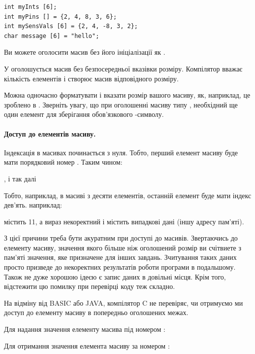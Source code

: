 \documentclass[12pt,a4paper]{report}  %
\begin{document}
\begin{lstlisting}[label=conditionoperator,caption=Оголошення масиву]
int myInts [6];
int myPins [] = {2, 4, 8, 3, 6};
int mySensVals [6] = {2, 4, -8, 3, 2};
char message [6] = "hello";
\end{lstlisting}

Ви можете оголосити масив без його ініціалізації як .

У  оголошується масив без безпосередньої вказівки розміру. Компілятор вважає кількість елементів і створює масив відповідного розміру.

Можна одночасно форматувати і вказати розмір вашого масиву, як, наприклад, це зроблено в . Зверніть увагу, що при оголошенні масиву типу , необхідний ще один елемент для зберігання обов'язкового -символу.

\paragraph{Доступ до елементів масиву.}
Індексація в масивах починається з нуля. Тобто, перший елемент масиву буде мати порядковий номер . Таким чином:

, і так далі

Тобто, наприклад, в масиві з десяти елементів, останній елемент буде мати індекс дев'ять. наприклад:

 містить 11, а вираз  некоректний і містить випадкові дані (іншу адресу пам'яті).

З цієї причини треба бути акуратним при доступі до масивів. Звертаючись до елементу масиву, значення якого більше ніж оголошений розмір ви счітвиете з пам'яті значення, яке призначене для інших завдань. Зчитування таких даних просто призведе до некоректних результатів роботи програми в подальшому. Також не дуже хорошою ідеєю є запис даних в довільні місця. Крім того, відстежити цю помилку при перевірці коду теж складно.

На відміну від BASIC або JAVA, компілятор C не перевіряє, чи отримуємо ми доступ до елементу масиву в попередньо оголошених межах.

Для надання значення елементу масива під номером :


Для отримання значення елемента масиву за номером :
\end{document}
